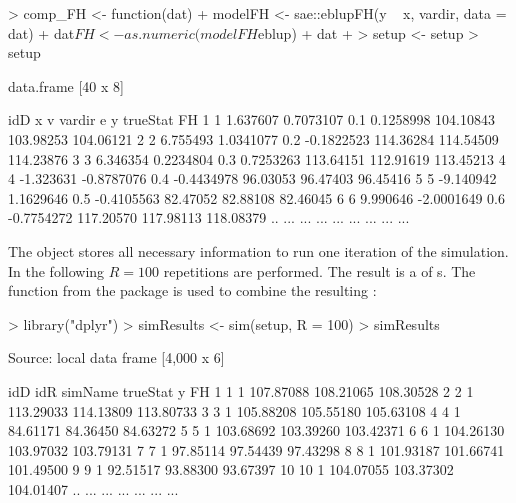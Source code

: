 \documentclass[article]{ajs}
\begin{document}
\begin{Schunk}
\begin{Sinput}
> comp_FH <- function(dat) {
+   modelFH <- sae::eblupFH(y ~ x, vardir, data = dat)
+   dat$FH <- as.numeric(modelFH$eblup)
+   dat
+ }
> setup <- setup %
> setup
\end{Sinput}
\begin{Soutput}
data.frame [40 x 8]

   idD         x          v vardir          e         y  trueStat        FH
1    1  1.637607  0.7073107    0.1  0.1258998 104.10843 103.98253 104.06121
2    2  6.755493  1.0341077    0.2 -0.1822523 114.36284 114.54509 114.23876
3    3  6.346354  0.2234804    0.3  0.7253263 113.64151 112.91619 113.45213
4    4 -1.323631 -0.8787076    0.4 -0.4434978  96.03053  96.47403  96.45416
5    5 -9.140942  1.1629646    0.5 -0.4105563  82.47052  82.88108  82.46045
6    6  9.990646 -2.0001649    0.6 -0.7754272 117.20570 117.98113 118.08379
.. ...       ...        ...    ...        ...       ...       ...       ...
\end{Soutput}
\end{Schunk}

The object  stores all necessary information to run one iteration of the simulation. In the following $R = 100$ repetitions are performed. The result is a  of s. The function  from the package  is used to combine the resulting :

\begin{Schunk}
\begin{Sinput}
> library("dplyr")
> simResults <- sim(setup, R = 100) %
> simResults %
\end{Sinput}
\begin{Soutput}
Source: local data frame [4,000 x 6]

   idD idR simName  trueStat         y        FH
1    1   1         107.87088 108.21065 108.30528
2    2   1         113.29033 114.13809 113.80733
3    3   1         105.88208 105.55180 105.63108
4    4   1          84.61171  84.36450  84.63272
5    5   1         103.68692 103.39260 103.42371
6    6   1         104.26130 103.97032 103.79131
7    7   1          97.85114  97.54439  97.43298
8    8   1         101.93187 101.66741 101.49500
9    9   1          92.51517  93.88300  93.67397
10  10   1         104.07055 103.37302 104.01407
.. ... ...     ...       ...       ...       ...
\end{Soutput}
\end{Schunk}
\end{document}
